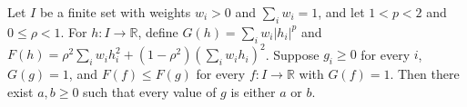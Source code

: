 \begin{theorem}
\leanok
{}
Let $I$ be a finite set with weights $w_i>0$ and $\sum_iw_i=1$, and let $1<p<2$ and
$0\le\rho<1$. For $h:I\to\mathbb{R}$, define $G(h)=\sum_iw_i|h_i|^p$ and
$F(h)=\rho^2\sum_iw_i h_i^2+(1-\rho^2)(\sum_iw_i h_i)^2$. Suppose $g_i\ge0$ for every
$i$, $G(g)=1$, and $F(f)\le F(g)$ for every $f:I\to\mathbb{R}$ with $G(f)=1$. Then there
exist $a,b\ge0$ such that every value of $g$ is either $a$ or $b$.
\end{theorem}

